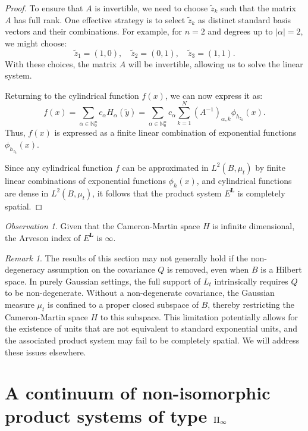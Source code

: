 \documentclass[11pt]{amsart}
\theoremstyle{definition}
\theoremstyle{remark}
\newtheorem{remark}[theorem]{Remark}
\newtheorem{observation}[theorem]{Observation}
\numberwithin{equation}{section}
\begin{document}
\begin{proof}
To ensure that \( A \) is invertible, we need to choose \( \tilde{z}_k \) such that the matrix \( A \) has full rank. One effective strategy is to select \( \tilde{z}_k \) as distinct standard basis vectors and their combinations. For example, for \( n = 2 \) and degrees up to \( |\alpha| = 2 \), we might choose:
\[
\tilde{z}_1 = (1, 0), \quad \tilde{z}_2 = (0, 1), \quad \tilde{z}_3 = (1, 1).
\]
With these choices, the matrix \( A \) will be invertible, allowing us to solve the linear system.


Returning to the cylindrical function \( f(x) \), we can now express it as:
\[
f(x) = \sum_{\alpha \in \mathbb{N}_0^n} c_\alpha H_\alpha\left( \tilde{y} \right) = \sum_{\alpha \in \mathbb{N}_0^n} c_\alpha \sum_{k=1}^N \left( A^{-1} \right)_{\alpha, k} \phi_{h_{z_k}}(x).
\]
Thus, \( f(x) \) is expressed as a finite linear combination of exponential functions \( \phi_{h_{z_k}}(x) \).


Since any cylindrical function \( f \) can be approximated in \( L^2(B, \mu_t) \) by finite linear combinations of exponential functions \( \phi_h(x) \), and cylindrical functions are dense in \( L^2(B, \mu_t) \), it follows that the product system \( E^{\bm{L}} \) is completely spatial.
\end{proof}
\begin{observation}
Given that the Cameron-Martin space \(H\) is infinite dimensional, the Arveson index of \(E^{\bm{L}}\) is \(\infty\).
\end{observation}
\begin{remark} The results of this section may not generally hold if the non-degeneracy assumption on the covariance \(Q\) is removed, even when \(B\) is a Hilbert space. In purely Gaussian settings, the full support of \(L_t\) intrinsically requires \(Q\) to be non-degenerate. Without a non-degenerate covariance, the Gaussian measure  \( \mu_t \) is confined to a proper closed subspace of \(B\), thereby restricting the Cameron-Martin space \(H\) to this subspace. This limitation potentially allows for the existence of units that are not equivalent to standard exponential units, and the associated product system may fail to be completely spatial. We will address these issues elsewhere. \end{remark}










\section{A continuum of non-isomorphic product systems of type \(\rm{II}\sb{\infty}\)}\label{sec:examples}
\end{document}
